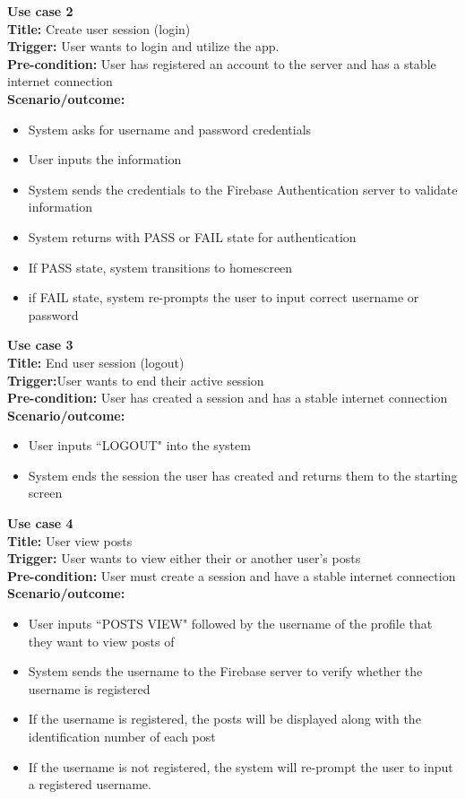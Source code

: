 \documentclass[12pt, titlepage]{article}
\begin{document}
\textbf{Use case 2}\\
\textbf{Title:} Create user session (login)\\
\textbf{Trigger:} User wants to login and utilize the app.\\
\textbf{Pre-condition:} User has registered an account to the server and has a stable internet connection \\
\textbf{Scenario/outcome:}
    \begin{itemize}
        \item System asks for username and password credentials
        \item User inputs the information
        \item System sends the credentials to the Firebase Authentication server to validate information
        \item System returns with PASS or FAIL state for authentication
        \item If PASS state, system transitions to homescreen
        \item if FAIL state, system re-prompts the user to input correct username or password
    \end{itemize}
    
\textbf{Use case 3}\\
\textbf{Title:} End user session (logout)\\
\textbf{Trigger:}User wants to end their active session\\
\textbf{Pre-condition:} User has created a session and has a stable internet connection\\
\textbf{Scenario/outcome:}
    \begin{itemize}
        \item User inputs ``LOGOUT" into the system
        \item System ends the session the user has created and returns them to the starting screen
    \end{itemize}
    
\textbf{Use case 4}\\
\textbf{Title:} User view posts\\
\textbf{Trigger:} User wants to view either their or another user's posts\\
\textbf{Pre-condition:} User must create a session and have a stable internet connection\\
\textbf{Scenario/outcome:}
    \begin{itemize}
        \item User inputs ``POSTS VIEW" followed by the username of the profile that they want to view posts of
        \item System sends the username to the Firebase server to verify whether the username is registered
        \item If the username is registered, the posts will be displayed along with the identification number of each post
        \item If the username is not registered, the system will re-prompt the user to input a registered username.
    \end{itemize}
    
\end{document}

